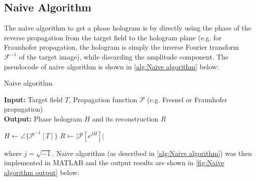 \subsection{Naive Algorithm}\label{sec:Naive algorithm}
The naive algorithm to get a phase hologram is by directly using the phase of the reverse propagation from the target field to the hologram plane (e.g. for Fraunhofer propagation, the hologram is simply the inverse Fourier transform $\mathcal{F} ^{-1}$ of the target image), while discarding the amplitude component. The pseudocode of naive algorithm is shown in \cref{alg:Naive algorithm} below:
\begin{algorithm}[H]
  \caption{Naive algorithm}\label{alg:Naive algorithm}
  \textbf{Input:} Target field $T$, Propagation function $\mathcal{P}$ (e.g. Fresnel or Fraunhofer propagation)\\
  \textbf{Output:} Phase hologram $H$ and its reconstruction $R$
  \begin{algorithmic}
    \State $H \gets \angle\{\mathcal{P}^{-1}[T]\}$
    \State $R \gets \vert \mathcal{P}[e^{jH}] \vert$
  \end{algorithmic}
\end{algorithm}
where $j = \sqrt{-1} $. Naive algorithm (as described in \cref{alg:Naive algorithm}) was then implemented in MATLAB and the output results are shown in \cref{fig:Naive algorithm output} below:

